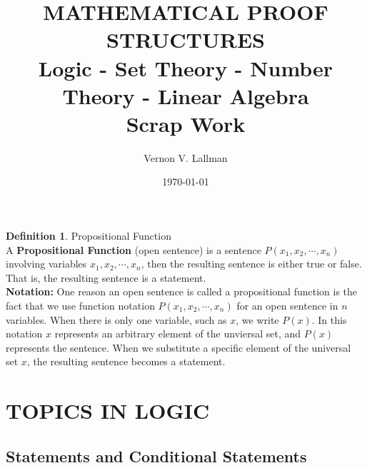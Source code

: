 \documentclass{book}
\title{\textsc{MATHEMATICAL PROOF STRUCTURES}\\ {\bf Logic - Set Theory - Number Theory - Linear Algebra}\\ Scrap Work}
\author{Vernon V. Lallman}
\date{\today}
\theoremstyle{definition}
\newtheorem{definition}[theorem]{Definition}
\begin{document}
 \maketitle

\tableofcontents

\newpage
\begin{definition}
Propositional Function \\
    
    A {\bf Propositional Function} (open sentence) is a sentence $P(x_1, x_2, \cdots, x_n)$ involving variables $x_1, x_2, \cdots, x_n$, then the resulting sentence is either true or false. That is, the resulting sentence is a statement. \\
    {\bf Notation:} One reason an open sentence is called a propositional function is the fact that we use function notation $P(x_1, x_2, \cdots, x_n)$ for an open sentence in $n$ variables. When there is only one variable, such as $x$, we write $P(x)$. In this notation $x$ represents an arbitrary element of the unviersal set, and $P(x)$ represents the sentence. When we substitute a specific element of the universal set $x$, the resulting sentence becomes a statement. \\
\end{definition}



\newpage
\section{TOPICS IN LOGIC}
\subsection{Statements and Conditional Statements}
\end{document}
